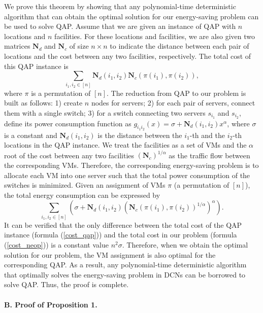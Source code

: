 \documentclass[journal,single-space,two column,twoside,10pt]{IEEEtran}
\begin{document}
We prove this theorem by showing that any polynomial-time deterministic algorithm that can obtain the optimal solution for our energy-saving problem can be used to solve QAP. Assume that we are given an instance of QAP with $n$ locations and $n$ facilities. For these locations and facilities, we are also given two matrices $\mathbf{N}_d$ and $\mathbf{N}_c$ of size $n \times n$ to indicate the distance between each pair of locations and the cost between any two facilities, respectively. The total cost of this QAP instance is
\begin{equation}
	\sum_{i_1,i_2 \in [n]} \mathbf{N}_d(i_1,i_2) \mathbf{N}_c\left(\pi(i_1), \pi(i_2)\right), \label{cost_qap}
\end{equation}
where $\pi$ is a permutation of $[n]$. The reduction from QAP to our problem is built as follows: 1) create $n$ nodes for servers; 2) for each pair of servers, connect them with a single switch; 3) for a switch connecting two servers $s_{i_1}$ and $s_{i_2}$, define its power consumption function as $g_{i_1i_2}(x) = \sigma + \mathbf{N}_d(i_1,i_2) x^{\alpha}$, where $\sigma$ is a constant and $\mathbf{N}_d(i_1,i_2)$ is the distance between the $i_1$-th and the $i_2$-th locations in the QAP instance. We treat the facilities as a set of VMs and the $\alpha$ root of the cost between any two facilities $(\mathbf{N}_c)^{1/\alpha}$ as the traffic flow between the corresponding VMs. Therefore, the corresponding energy-saving problem is to allocate each VM into one server such that the total power consumption of the switches is minimized. Given an assignment of VMs $\pi$ (a permutation of $[n]$), the total energy consumption can be expressed by
\begin{equation}
	\sum_{i_1,i_2 \in [n]} \left( \sigma + \mathbf{N}_d(i_1,i_2) \left(\mathbf{N}_c(\pi(i_1), \pi(i_2))^{1/\alpha}\right)^{\alpha} \right). \label{cost_neop}
\end{equation}
It can be verified that the only difference between the total cost of the QAP instance (formula (\ref{cost_qap})) and the total cost in our problem (formula (\ref{cost_neop})) is a constant value $n^2\sigma$. Therefore, when we obtain the optimal solution for our problem, the VM assignment is also optimal for the corresponding QAP. As a result, any polynomial-time deterministic algorithm that optimally solves the energy-saving problem in DCNs can be borrowed to solve QAP. Thus, the proof is complete.
\\\\
\noindent\textbf{B. Proof of Proposition 1.}
\end{document}

